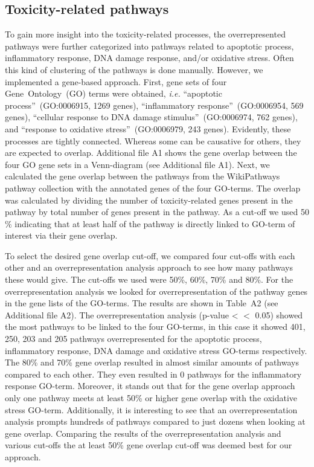 \documentclass[ijms,article,submit,moreauthors,pdftex]{Definitions/mdpi}
\begin{document}
\subsection*{Toxicity-related pathways}
To gain more insight into the toxicity-related processes, the overrepresented pathways were further categorized into pathways related to apoptotic process, inflammatory response, DNA damage response, and/or oxidative stress. Often this kind of clustering of the pathways is done manually. However, we implemented a gene-based approach. First, gene sets of four Gene~Ontology~(GO) terms were obtained, \textit{i.e.} “apoptotic process”~(GO:0006915, 1269 genes), “inflammatory response”~(GO:0006954, 569 genes),  “cellular response to DNA damage stimulus”~(GO:0006974, 762 genes), and “response to oxidative stress”~(GO:0006979, 243 genes). Evidently, these processes are tightly connected. Whereas some can be causative for others, they are expected to overlap.  Additional file A1 shows the gene overlap between the four GO gene sets in a Venn-diagram (see Additional file A1). Next, we calculated the gene overlap between the pathways from the WikiPathways pathway collection with the annotated genes of the four GO-terms. The overlap was calculated by dividing the number of toxicity-related genes present in the pathway by total number of genes present in the pathway. As a cut-off we used 50$\%$ indicating that at least half of the pathway is directly linked to GO-term of interest via their gene overlap.

To select the desired gene overlap cut-off, we compared four cut-offs with each other and an overrepresentation analysis approach to see how many pathways these would give. The cut-offs we used were 50\%, 60\%, 70\% and 80\%. For the overrepresentation analysis we looked for overrepresentation of the pathway genes in the gene lists of the GO-terms. The results are shown in Table~A2 (see Additional file A2). The overrepresentation analysis (p-value < $<$ 0.05) showed the most pathways to be linked to the four GO-terms, in this case it showed 401, 250, 203 and 205 pathways overrepresented for the apoptotic process, inflammatory response, DNA damage and oxidative stress GO-terms respectively. The 80\% and 70\% gene overlap resulted in almost similar amounts of pathways compared to each other. They even resulted in 0 pathways for the inflammatory response GO-term. Moreover, it stands out that for the gene overlap approach only one pathway meets at least 50\% or higher gene overlap with the oxidative stress GO-term. Additionally, it is interesting to see that an overrepresentation analysis prompts hundreds of pathways compared to just dozens when looking at gene overlap. Comparing the results of the overrepresentation analysis and various cut-offs the at least 50\% gene overlap cut-off was deemed best for our approach. 
\end{document}

